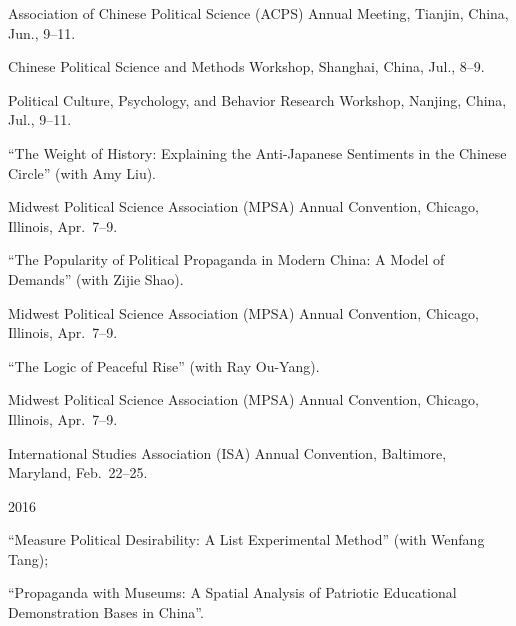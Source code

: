 \documentclass[10.5pt,]{article}
\providecommand{\tightlist}{%
	\setlength{\itemsep}{0pt}\setlength{\parskip}{0pt}}
\renewenvironment{itemize}{
	\begin{list}{}{
			\setlength{\leftmargin}{1.5em}
		}
	}{
	\end{list}
}
\begin{document}
\begin{itemize}
\begin{itemize}
    \begin{itemize}
    \tightlist
    \item
      \footnotesize Association of Chinese Political Science (ACPS)
      Annual Meeting, Tianjin, China, Jun., 9--11.
    \item
      \footnotesize Chinese Political Science and Methods Workshop,
      Shanghai, China, Jul., 8--9.
    \item
      \footnotesize Political Culture, Psychology, and Behavior Research
      Workshop, Nanjing, China, Jul., 9--11.
    \end{itemize}
  \item
    ``The Weight of History: Explaining the Anti-Japanese Sentiments in
    the Chinese Circle'' (with Amy Liu).

    \begin{itemize}
    \tightlist
    \item
      \footnotesize Midwest Political Science Association (MPSA) Annual
      Convention, Chicago, Illinois, Apr.~7--9.
    \end{itemize}
  \item
    ``The Popularity of Political Propaganda in Modern China: A Model of
    Demands'' (with Zijie Shao).

    \begin{itemize}
    \tightlist
    \item
      \footnotesize Midwest Political Science Association (MPSA) Annual
      Convention, Chicago, Illinois, Apr.~7--9.
    \end{itemize}
  \item
    ``The Logic of Peaceful Rise'' (with Ray Ou-Yang).

    \begin{itemize}
    \tightlist
    \item
      \footnotesize Midwest Political Science Association (MPSA) Annual
      Convention, Chicago, Illinois, Apr.~7--9.
    \item
      \footnotesize International Studies Association (ISA) Annual
      Convention, Baltimore, Maryland, Feb.~22--25.
    \end{itemize}
  \end{itemize}
\item
  2016

  \begin{itemize}
  \tightlist
  \item
    ``Measure Political Desirability: A List Experimental Method'' (with
    Wenfang Tang);
  \item
    ``Propaganda with Museums: A Spatial Analysis of Patriotic
    Educational Demonstration Bases in China''.


\end{itemize}
\end{itemize}
\end{document}
